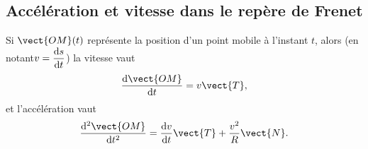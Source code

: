 \subsection{Accélération et vitesse dans le repère de Frenet}

Si $\vect{OM}(t)$ représente la position d'un point mobile à l'instant $t$, alors (en notant$v=\dfrac{\mathrm{d} s}{\mathrm{d} t}$) la vitesse vaut
\begin{equation}
  \derived{\vect{OM}}{t} = v \vect{T},
\end{equation}
et l'accélération vaut
\begin{equation}
  \deriveds{\vect{OM}}{t} = \derived{v}{t} \vect{T} + \frac{v^2}{R} \vect{N}.
\end{equation}